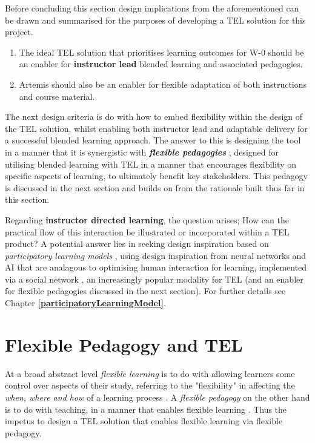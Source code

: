 Before concluding this section design implications from the aforementioned can be drawn and summarised for the purposes of developing a TEL solution for this project. \begin{enumerate}
    \item The ideal TEL solution that prioritises learning outcomes for W-0 should be an enabler for \textbf{instructor lead} blended learning and associated pedagogies.
    \item Artemis should also be an enabler for flexible adaptation of both instructions and course material.
\end{enumerate}


The next design criteria is do with how to embed  flexibility within the design of the TEL solution, whilst enabling  both instructor lead and adaptable delivery for a successful blended learning approach. The answer to this is designing the tool in a manner that it is synergistic with \textbf{ \textit{flexible pedagogies}} \cite{Gordon2014,Burge2011}; designed for utilising blended learning with TEL in a manner that encourages flexibility on specific aspects of learning, to ultimately benefit key stakeholders. This pedagogy is discussed in the next section and builds on from the rationale built thus far in this section.

Regarding \textbf{instructor directed learning}, the question arises; How can the practical flow of this  interaction be illustrated or incorporated within a TEL product? A potential answer lies in seeking design inspiration based on  \textit{participatory learning models} \cite{Yager1990,Yager2004}, using design inspiration from neural networks and AI  that are analagous to optimising human interaction for learning, implemented via a social network \cite{Gordon2014,Burge2011}, an increasingly popular modality for TEL (and an enabler for flexible pedagogies discussed in the next section). For further details see Chapter \textbf{\ref{participatoryLearningModel}}.



\section{Flexible Pedagogy and TEL}

At a broad abstract level \textit{flexible learning} is to do with allowing learners some control over aspects of their study, referring to the "flexibility" in affecting the \textit{when, where and how} of a learning process \cite{Gordon2014,Burge2011}. A \textit{flexible pedagogy} on the other hand is to do with teaching, in a manner that enables flexible learning \cite{Gordon2014}. Thus the impetus to design a TEL solution that enables flexible learning via flexible pedagogy.

